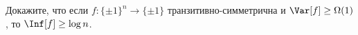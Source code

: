 Докажите, что если $f\colon \{\pm 1\}^n \to \{\pm 1\}$ транзитивно-симметрична и $\Var[f] \ge \Omega(1)$,
то $\Inf[f] \ge \log n$. 